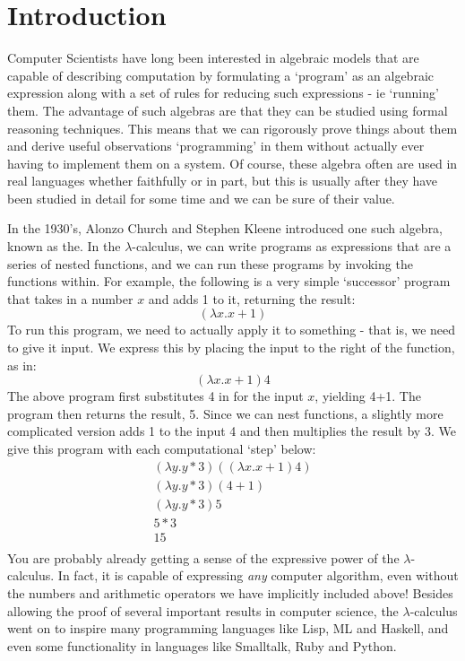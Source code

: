 \chapter{Introduction}
	Computer Scientists have long been interested in algebraic models that are capable of describing computation by formulating a `program' as an algebraic expression along with a set of rules for reducing such expressions - ie `running' them.  The advantage of such algebras are that they can be studied using formal reasoning techniques.  This means that we can rigorously prove things about them and derive useful observations `programming' in them without actually ever having to implement them on a system.  Of course, these algebra often are used in real languages whether faithfully or in part, but this is usually after they have been studied in detail for some time and we can be sure of their value.
	
	In the 1930's, Alonzo Church and Stephen Kleene introduced one such algebra, known as the.  In the $\lambda$-calculus, we can write programs as expressions that are a series of nested functions, and we can run these programs by invoking the functions within.  For example, the following is a very simple `successor' program that takes in a number $x$ and adds 1 to it, returning the result:
	\[
		(\lambda x. x + 1)
	\]
To run this program, we need to actually apply it to something - that is, we need to give it input.  We express this by placing the input to the right of the function, as in:
\[
	(\lambda x. x + 1) 4
\]
The above program first substitutes 4 in for the input $x$, yielding 4+1.  The program then returns the result, 5.  Since we can nest functions, a slightly more complicated version adds 1 to the input 4 and then multiplies the result by 3.  We give this program with each computational `step' below:
\begin{align*}
	(\lambda y. y * 3) ((\lambda x. x + 1) 4)\\
	(\lambda y. y * 3) (4+1)\\
	(\lambda y. y * 3) 5\\
	5 * 3\\
	15\\
\end{align*}
You are probably already getting a sense of the expressive power of the $\lambda$-calculus.  In fact, it is capable of expressing \emph{any} computer algorithm, even without the numbers and arithmetic operators we have implicitly included above!  Besides allowing the proof of several important results in computer science, the $\lambda$-calculus went on to inspire many programming languages like Lisp, ML and Haskell, and even some functionality in languages like Smalltalk, Ruby and Python.

